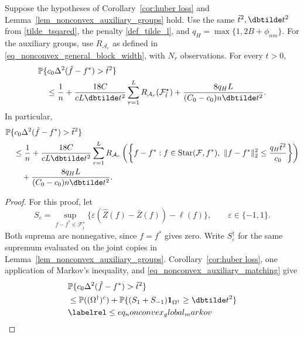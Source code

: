 \documentclass[twoside,11pt]{article}
\newenvironment{revision}{\color{revisionred}}{}
\begin{document}
\begin{revision}
\begin{lemma}
\label{lem_nonconvex_huber_rate}
Suppose the hypotheses of Corollary~\ref{cor:huber loss} and
Lemma~\ref{lem_nonconvex_auxiliary_groups} hold.
Use the same $\tilde t^2,\dbtilde t^2$ from
\eqref{tilde_tsqared}, the penalty \eqref{def_tilde_l}, and
$q_H=\max\{1,2B+\phi_{nm}\}$.
For the auxiliary groups, use
$R_{\mathcal A_r}$ as defined in
\eqref{eq_nonconvex_general_block_width}, with $N_r$ observations.
For every $t>0$,
\begin{equation}
\label{3_exp:bridge}
\begin{aligned}
&\mathbb P\{c_0\Delta^2(\hat f-f^*)>\tilde t^2\}\\
&\quad\leq\frac1n+
\frac{18C}{cL\dbtilde t^2}
\sum_{r=1}^L R_{\mathcal A_r}(\mathcal F_{\tilde t}^{\star})
+\frac{8q_H L}{(C_0-c_0)n\dbtilde t^2}.
\end{aligned}
\end{equation}
In particular,
\begin{equation}
\label{c_final_rate}
\begin{aligned}
&\mathbb P\{c_0\Delta^2(\hat f-f^*)>\tilde t^2\}\\
&\quad\leq\frac1n+
\frac{18C}{cL\dbtilde t^2}\sum_{r=1}^L
R_{\mathcal A_r}\left(
\left\{f-f^*:f\in\operatorname{Star}(\mathcal F,f^*),\
\|f-f^*\|_2^2\leq\frac{q_H\tilde t^2}{c_0}\right\}\right)\\
&\qquad+\frac{8q_H L}{(C_0-c_0)n\dbtilde t^2}.
\end{aligned}
\end{equation}
\end{lemma}
\begin{proof}
For this proof, let
\[
S_\varepsilon=
\sup_{f-f^*\in\mathcal F_{\tilde t}^{\star}}
\{\varepsilon(\hat Z(f)-\bar Z(f))-\ell(f)\},
\qquad \varepsilon\in\{-1,1\}.
\]
Both suprema are nonnegative, since $f=f^*$ gives zero.
Write $S_\varepsilon^\dagger$ for the same supremum evaluated
on the joint copies in Lemma~\ref{lem_nonconvex_auxiliary_groups}.
Corollary~\ref{cor:huber loss}, one application of Markov's
inequality, and \eqref{eq_nonconvex_auxiliary_matching} give
\begin{align*}
&\mathbb P\{c_0\Delta^2(\hat f-f^*)>\tilde t^2\}\\
&\leq\mathbb P((\Omega^\dagger)^c)
 +\mathbb P\{(S_1+S_{-1})\mathbf1_{\Omega^\dagger}
                                  \geq\dbtilde t^2\}\\
&\labelrel\leq{eq_nonconvex_global_markov}

\end{align*}
\end{proof}
\end{revision}
\end{document}
